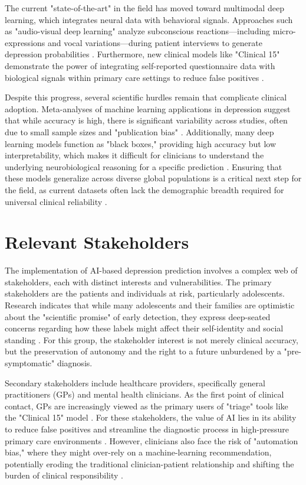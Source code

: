 \documentclass[12pt]{article}
\begin{document}
The current "state-of-the-art" in the field has moved toward multimodal deep learning, which integrates neural data with behavioral signals. Approaches such as "audio-visual deep learning" analyze subconscious reactions—including micro-expressions and vocal variations—during patient interviews to generate depression probabilities \citep{liu2025}. Furthermore, new clinical models like "Clinical 15" demonstrate the power of integrating self-reported questionnaire data with biological signals within primary care settings to reduce false positives \citep{eder2026, weber2025}.

Despite this progress, several scientific hurdles remain that complicate clinical adoption. Meta-analyses of machine learning applications in depression suggest that while accuracy is high, there is significant variability across studies, often due to small sample sizes and "publication bias" \citep{lee2020corrigendum}. Additionally, many deep learning models function as "black boxes," providing high accuracy but low interpretability, which makes it difficult for clinicians to understand the underlying neurobiological reasoning for a specific prediction \citep{ahire2025, weber2025}. Ensuring that these models generalize across diverse global populations is a critical next step for the field, as current datasets often lack the demographic breadth required for universal clinical reliability \citep{ricci2025}.

\section{Relevant Stakeholders}

The implementation of AI-based depression prediction involves a complex web of stakeholders, each with distinct interests and vulnerabilities. The primary stakeholders are the patients and individuals at risk, particularly adolescents. Research indicates that while many adolescents and their families are optimistic about the "scientific promise" of early detection, they express deep-seated concerns regarding how these labels might affect their self-identity and social standing \citep{kohrt2025}. For this group, the stakeholder interest is not merely clinical accuracy, but the preservation of autonomy and the right to a future unburdened by a "pre-symptomatic" diagnosis.

Secondary stakeholders include healthcare providers, specifically general practitioners (GPs) and mental health clinicians. As the first point of clinical contact, GPs are increasingly viewed as the primary users of "triage" tools like the "Clinical 15" model \citep{eder2026}. For these stakeholders, the value of AI lies in its ability to reduce false positives and streamline the diagnostic process in high-pressure primary care environments \citep{weber2025}. However, clinicians also face the risk of "automation bias," where they might over-rely on a machine-learning recommendation, potentially eroding the traditional clinician-patient relationship and shifting the burden of clinical responsibility \citep{ricci2025}.
\end{document}
